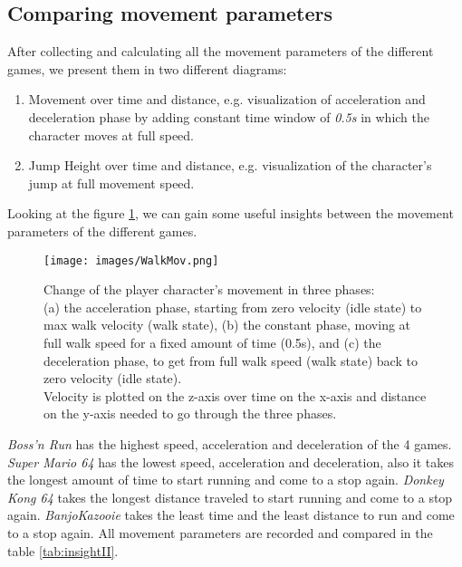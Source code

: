 \documentclass[conference]{IEEEtran}
\begin{document}
\subsection{Comparing movement parameters}

After collecting and calculating all the movement parameters of the different games, we present them in two different diagrams:

\begin{enumerate}
    \item Movement over time and distance, e.g. visualization of acceleration and deceleration phase by adding constant time window of \textit{0.5s} in which the character moves at full speed.
    \item Jump Height over time and distance, e.g. visualization of the character's jump at full movement speed.
\end{enumerate}

Looking at the figure \ref{fig:walk_mov}, we can gain some useful insights between the movement parameters of the different games.

\begin{figure}[!ht]
    \centering
    \texttt{[image: images/WalkMov.png]} %
    \caption{Change of the player character's movement in three phases: \\
    (a) the acceleration phase, starting from zero velocity (idle state) to max walk velocity (walk state), 
    (b) the constant phase, moving at full walk speed for a fixed amount of time (0.5s), and 
    (c) the deceleration phase, to get from full walk speed (walk state) back to zero velocity (idle state). \\
    Velocity is plotted on the z-axis over time on the x-axis and distance on the y-axis needed to go through the three phases.}
    \label{fig:walk_mov}
\end{figure}

\textit{Boss'n Run} has the highest speed, acceleration and deceleration of the 4 games.
\textit{Super Mario 64} has the lowest speed, acceleration and deceleration, also it takes the longest amount of time to start running and come to a stop again.
\textit{Donkey Kong 64} takes the longest distance traveled to start running and come to a stop again. 
\textit{BanjoKazooie} takes the least time and the least distance to run and come to a stop again.
All movement parameters are recorded and compared in the table \ref{tab:insightII}.
\end{document}
